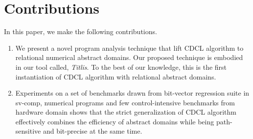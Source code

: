 \section{Contributions}
In this paper, we make the following contributions.
\begin{enumerate}
\item We present a novel program analysis technique that 
lift CDCL algorithm to relational numerical abstract domains.   
Our proposed technique is embodied in our tool called, {\em Titlis}.  
To the best of our knowledge, this is the first instantiation of CDCL 
algorithm with relational abstract domains. 
 
\item  Experiments on a set of benchmarks drawn from bit-vector 
regression suite in sv-comp, numerical programs and few 
control-intensive benchmarks from hardware domain shows that 
the strict generalization of CDCL algorithm effectively combines 
the efficiency of abstract domains while being path-sensitive and 
bit-precise at the same time.  
\end{enumerate}
